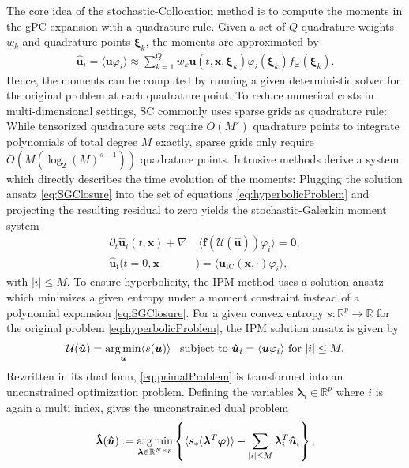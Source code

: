 The core idea of the stochastic-Collocation method is to compute the moments in the gPC expansion with a quadrature rule. Given a set of $Q$ quadrature weights $w_k$ and quadrature points $\bm{\xi}_k$, the moments are approximated by
\begin{align*}
\bm{\hat u}_i = \langle \bm{u}\varphi_i \rangle \approx \sum_{k = 1}^{Q}w_k \bm{u}({t,\bm{x},\bm{\xi}_k})\varphi_i(\bm{\xi}_k)f_{\Xi}(\bm{\xi}_k).
\end{align*} 
Hence, the moments can be computed by running a given deterministic solver for the original problem at each quadrature point. To reduce numerical costs in multi-dimensional settings, SC commonly uses sparse grids as quadrature rule: While tensorized quadrature sets require $O(M^s)$ quadrature points to integrate polynomials of total degree $M$ exactly, sparse grids only require $O(M(\log_2(M)^{s-1}))$ quadrature points. Intrusive methods derive a system which directly describes the time evolution of the moments: Plugging the solution ansatz \eqref{eq:SGClosure} into the set of equations \eqref{eq:hyperbolicProblem} and projecting the resulting residual to zero yields the stochastic-Galerkin moment system
\begin{subequations}\label{eq:SGMomentSystem}
\begin{align}
\partial_t \bm{\hat u}_i(t,\bm{x}) + \nabla&\cdot\langle\bm{f}(\mathcal{U}(\bm{\hat u})) \varphi_i\rangle = \bm{0}, \\
\bm{\hat u_i}(t=0,\bm{x}&) = \langle\bm{u}_{\text{IC}}(\bm{x},\cdot)\varphi_i\rangle,
\end{align}
\end{subequations}
with $|i|\leq M$. To ensure hyperbolicity, the IPM method uses a solution ansatz which minimizes a given entropy under a moment constraint instead of a polynomial expansion \eqref{eq:SGClosure}. For a given convex entropy $s:\mathbb{R}^p\to\mathbb{R}$ for the original problem \eqref{eq:hyperbolicProblem}, the IPM solution ansatz is given by
\begin{align}\label{eq:primalProblem}
\mathcal{U}(\bm{\hat u}) = \operatorname*{arg\,min}_{\bm u} \langle s(\bm u) \rangle \enskip \text{ subject to } \bm{\hat u}_i = \langle \bm u \varphi_i \rangle \text{ for } |i| \leq M.
\end{align}
Rewritten in its dual form, \eqref{eq:primalProblem} is transformed into an unconstrained optimization problem. Defining the variables $\bm{\lambda}_i\in\mathbb{R}^p$ where $i$ is again a multi index, gives the unconstrained dual problem
\begin{align}\label{eq:dualProblem}
 \bm{\hat \lambda}(\bm{\hat u}) := \operatorname*{arg\,min}_{\bm{\lambda} \in \mathbb{R}^{N \times p}}
  \left\{\langle s_*(\bm{\lambda}^T \bm\varphi)\rangle - \sum_{|i|\leq M}\bm{\lambda}_i^T \bm{\hat u}_i\right\},
\end{align}
